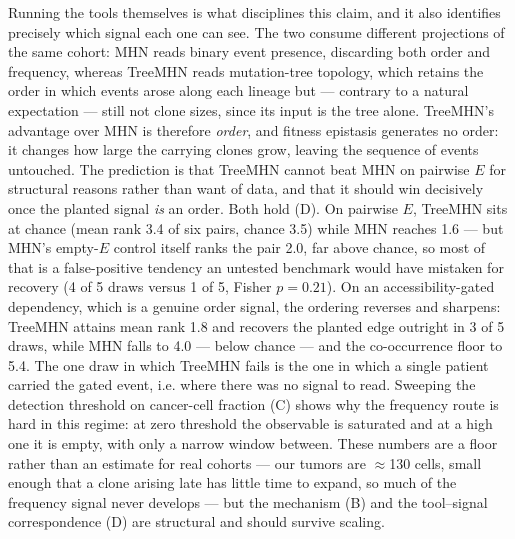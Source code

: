 \documentclass{article}
\begin{document}
Running the tools themselves is what disciplines this claim, and it also identifies precisely which
signal each one can see. The two consume different projections of the same cohort: MHN reads binary
event presence, discarding both order and frequency, whereas TreeMHN reads mutation-tree topology,
which retains the order in which events arose along each lineage but --- contrary to a natural
expectation --- still not clone sizes, since its input is the tree alone. TreeMHN's advantage over
MHN is therefore \emph{order}, and fitness epistasis generates no order: it changes how large the
carrying clones grow, leaving the sequence of events untouched. The prediction is that TreeMHN cannot
beat MHN on pairwise $E$ for structural reasons rather than want of data, and that it should win
decisively once the planted signal \emph{is} an order. Both hold (D). On pairwise
$E$, TreeMHN sits at chance (mean rank 3.4 of six pairs, chance 3.5) while MHN reaches 1.6 --- but
MHN's empty-$E$ control itself ranks the pair 2.0, far above chance, so most of that is a
false-positive tendency an untested benchmark would have mistaken for recovery (4 of 5 draws versus 1
of 5, Fisher $p = 0.21$). On an accessibility-gated dependency, which is a genuine order signal, the
ordering reverses and sharpens: TreeMHN attains mean rank 1.8 and recovers the planted edge outright
in 3 of 5 draws, while MHN falls to 4.0 --- below chance --- and the co-occurrence floor to 5.4. The
one draw in which TreeMHN fails is the one in which a single patient carried the gated event, i.e.
where there was no signal to read. Sweeping the detection threshold on cancer-cell fraction
(C) shows why the frequency route is hard in this regime: at zero threshold the
observable is saturated and at a high one it is empty, with only a narrow window between. These
numbers are a floor rather than an estimate for real cohorts --- our tumors are $\approx$130 cells,
small enough that a clone arising late has little time to expand, so much of the frequency signal
never develops --- but the mechanism (B) and the tool--signal correspondence
(D) are structural and should survive scaling.
\end{document}
